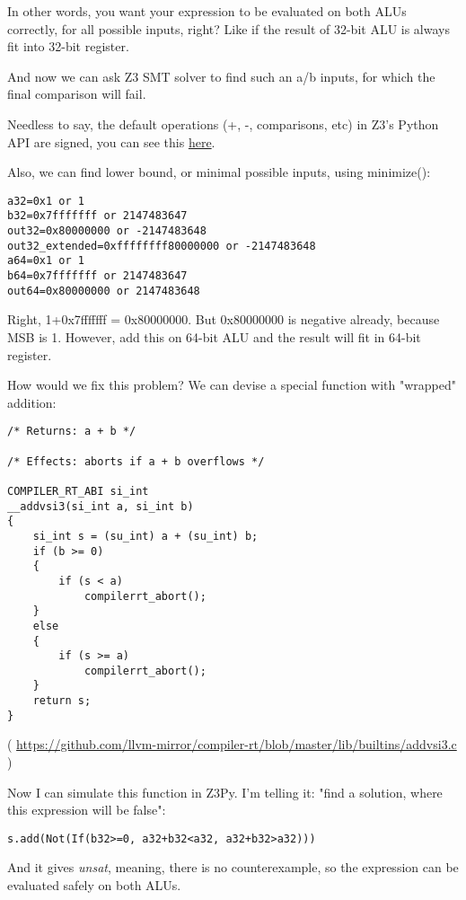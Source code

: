 In other words, you want your expression to be evaluated on both ALUs correctly, for all possible inputs, right?
Like if the result of 32-bit ALU is always fit into 32-bit register.

And now we can ask Z3 SMT solver to find such an a/b inputs, for which the final comparison will fail.

Needless to say, the default operations (+, -, comparisons, etc) in Z3's Python API are signed, you can see this 
\href{https://github.com/Z3Prover/z3/blob/master/src/api/python/z3/z3.py}{here}.

Also, we can find lower bound, or minimal possible inputs, using minimize():



\begin{lstlisting}
a32=0x1 or 1
b32=0x7fffffff or 2147483647
out32=0x80000000 or -2147483648
out32_extended=0xffffffff80000000 or -2147483648
a64=0x1 or 1
b64=0x7fffffff or 2147483647
out64=0x80000000 or 2147483648
\end{lstlisting}

Right, 1+0x7fffffff = 0x80000000.
But 0x80000000 is negative already, because \ac{MSB} is 1.
However, add this on 64-bit \ac{ALU} and the result will fit in 64-bit register.

How would we fix this problem?
We can devise a special function with "wrapped" addition:

\begin{lstlisting}[style=customc]
/* Returns: a + b */

/* Effects: aborts if a + b overflows */

COMPILER_RT_ABI si_int
__addvsi3(si_int a, si_int b)
{
    si_int s = (su_int) a + (su_int) b;
    if (b >= 0)
    {
        if (s < a)
            compilerrt_abort();
    }
    else
    {
        if (s >= a)
            compilerrt_abort();
    }
    return s;
}
\end{lstlisting}

( \url{https://github.com/llvm-mirror/compiler-rt/blob/master/lib/builtins/addvsi3.c} )

Now I can simulate this function in Z3Py.
I'm telling it: "find a solution, where this expression will be false":

\begin{lstlisting}
s.add(Not(If(b32>=0, a32+b32<a32, a32+b32>a32)))
\end{lstlisting}

And it gives \emph{unsat}, meaning, there is no counterexample, so the expression can be evaluated safely on both \ac{ALU}s.


